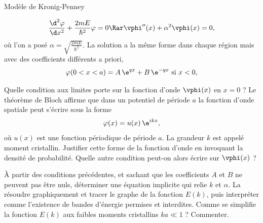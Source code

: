 \begin{exo}[PC][3][TD]{Modèle de Kronig-Penney}
\begin{quest}
{      \begin{equation*}
      \frac{\d^2\varphi}{\d x^2}+\frac{2mE}{\hbar^2}\varphi= 0 \Rar \vphi''(x) + \alpha^2\vphi(x) = 0,
      \end{equation*}
      où l'on a posé $\alpha=\sqrt{\frac{2mE}{\hbar^2}}$. La solution a la même forme dans chaque région mais avec des coefficients différents a priori,
      \begin{equation*}
        \varphi(0 <x < a) = A \,\e^{qx}+B\,\e^{ -qx} \text{ si } x<0, 
      \end{equation*}
      }
      \item Quelle condition aux limites porte sur la fonction d'onde $\vphi(x)$ en $x=0$ ? Le théorème de Bloch affirme que dans un potentiel de période $a$ la fonction d'onde spatiale peut s'écrire sous la forme $$\varphi(x) = u(x)\, \e^{ikx},$$
       où $u(x)$ est une fonction périodique de période $a$. La grandeur $k$ est appelé moment cristallin. Justifier cette forme de la fonction d'onde en invoquant la densité de probabilité. Quelle autre condition peut-on alors écrire sur $\vphi(x)$ ?
       \item À partir des conditions précédentes, et sachant que les coefficients $A$ et $B$ ne peuvent pas être nuls, déterminer une équation implicite qui relie $k$ et $\alpha$. La résoudre graphiquement et tracer le graphe de la fonction $E(k)$, puis interpréter comme l'existence de bandes d'énergie permises et interdites. Comme se simplifie la fonction $E(k)$ aux faibles moments cristallins $ka \ll 1$ ? Commenter.
    \end{quest}
\end{exo}



